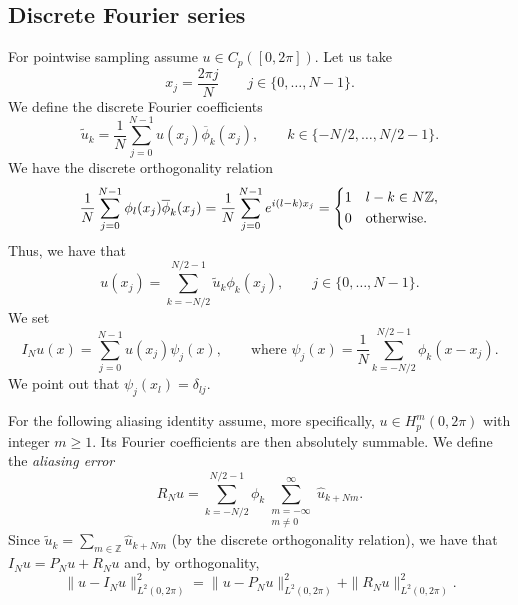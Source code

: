 \subsection{Discrete Fourier series}
For pointwise sampling assume $u\in C_p([0,2\pi])$. Let us take
\begin{equation*}
    x_j = \frac{2\pi j}{N} \qquad j \in \{0,\dots, N-1\}.
\end{equation*}
We define the discrete Fourier coefficients
\begin{equation*}
    \tilde u_k = \frac 1 N \sum_{j=0}^{N-1} u(x_j) \overline \phi_k(x_j), \qquad k \in \{-N/2, \dots, N/2-1\}.
\end{equation*}
We have the discrete orthogonality relation
\begin{equation*}
    \frac 1 N \sum_{j=0}^{N-1}  \phi_l(x_j) \overline \phi_k(x_j) = \frac 1 N \sum_{j=0}^{N-1} e^{i(l - k)x_j} = \begin{dcases}
        1 & l - k \in N \mathbb Z , \\
        0 & \text{otherwise}.
    \end{dcases}
\end{equation*}
Thus, we have that
\begin{equation*}
    u(x_j) = \sum_{k=-N/2}^{N/2-1} \tilde u_k \phi_k(x_j), \qquad j \in \{0, \dots, N-1\}.
\end{equation*}
We set
\begin{equation*}
    I_N u (x) = \sum_{j=0}^{N-1} u(x_j) \psi_j (x), \qquad \text{where } \psi_j (x) = \frac 1 N \sum_{k=-N/2}^{N/2 - 1} \phi_k(x-x_j).
\end{equation*}
We point out that $\psi_j (x_l) = \delta_{lj}$.

\bigskip

For the following aliasing identity assume, more specifically, $u\in H_p^m(0,2\pi)$ with integer $m\ge1$. Its Fourier coefficients are then absolutely summable. We define the \emph{aliasing error}
\begin{equation*}
    R_N u = \sum_{k=-N/2}^{N/2-1} \phi_k \sum_{\substack{m =-\infty \\ m \ne 0}}^{\infty} \hat u_{k + Nm}.
\end{equation*}
Since $\tilde u_k = \sum_{m \in \mathbb Z} \hat u_{k + Nm}$ (by the discrete orthogonality relation), we have that $I_N u = P_N u + R_N u$ and, by orthogonality,
\begin{equation}
    \|u - I_N u\|^2_{L^2(0,2\pi)} = \|u - P_N u\|^2_{L^2(0,2\pi)} + \|R_N u\|^2_{L^2(0,2\pi)}.
\end{equation}

